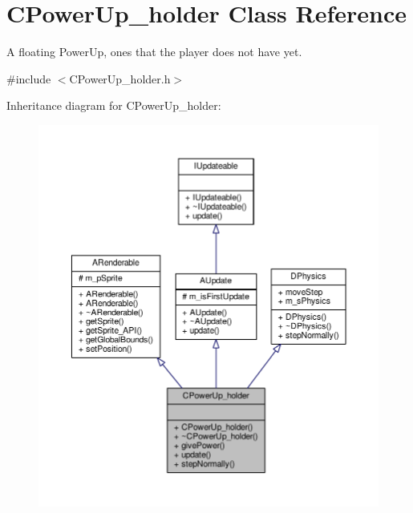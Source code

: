 \hypertarget{classCPowerUp__holder}{\section{C\-Power\-Up\-\_\-holder Class Reference}
\label{classCPowerUp__holder}
}


A floating Power\-Up, ones that the player does not have yet.  




{\ttfamily \#include $<$C\-Power\-Up\-\_\-holder.\-h$>$}



Inheritance diagram for C\-Power\-Up\-\_\-holder\-:\nopagebreak
\begin{figure}[H]
\begin{center}
\leavevmode
\includegraphics[width=350pt]{classCPowerUp__holder__inherit__graph}
\end{center}
\end{figure}


